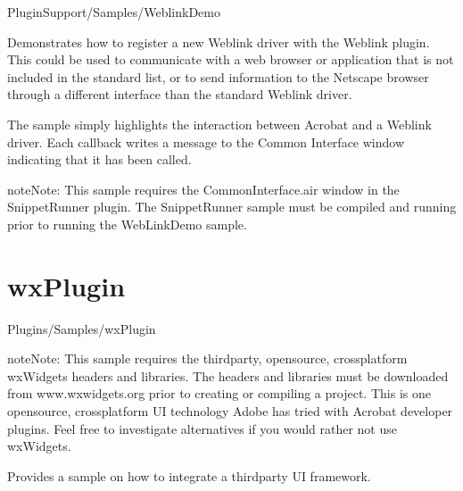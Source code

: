 \documentclass[letterpaper,12pt,english,openany,oneside]{sphinxmanual}
\begin{document}
PluginSupport/Samples/WeblinkDemo

\label{\detokenize{Samples_Plug_in:description-14}}

Demonstrates how to register a new Weblink driver with the Weblink plugin. This could be used to communicate with a web browser or application that is not included in the standard list, or to send information to the Netscape browser through a different interface than the standard Weblink driver.

\label{\detokenize{Samples_Plug_in:usage-11}}

The sample simply highlights the interaction between Acrobat and a Weblink driver. Each callback writes a message to the Common Interface window indicating that it has been called.

\begin{sphinxadmonition}{note}{Note:}
This sample requires the CommonInterface.air window in the SnippetRunner plugin. The SnippetRunner sample must be compiled and running prior to running the WebLinkDemo sample.
\end{sphinxadmonition}


\section{wxPlugin}
\label{\detokenize{Samples_Plug_in:wxplugin}}\label{\detokenize{Samples_Plug_in:location-14}}

Plugins/Samples/wxPlugin

\begin{sphinxadmonition}{note}{Note:}
This sample requires the third\sphinxhyphen{}party, open\sphinxhyphen{}source, cross\sphinxhyphen{}platform wxWidgets headers and libraries. The headers and libraries must be downloaded from www.wxwidgets.org prior to creating or compiling a project. This is one open\sphinxhyphen{}source, cross\sphinxhyphen{}platform UI technology Adobe has tried with Acrobat developer plugins. Feel free to investigate alternatives if you would rather not use wxWidgets.
\end{sphinxadmonition}
\label{\detokenize{Samples_Plug_in:description-15}}

Provides a sample on how to integrate a third\sphinxhyphen{}party UI framework.

\label{\detokenize{Samples_Plug_in:usage-12}}
\end{document}
